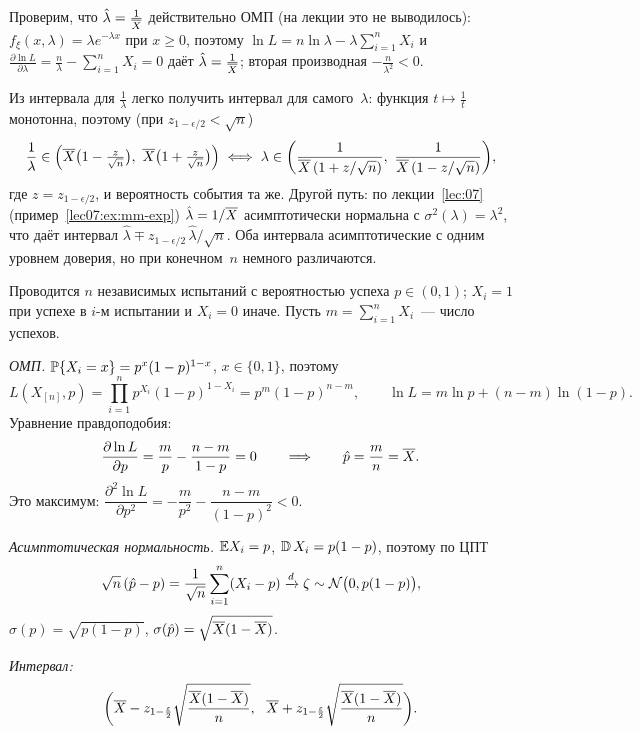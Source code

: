\begin{addendum}
  Проверим, что $\hat\lambda = \frac1\Xbar$ действительно ОМП (на лекции это не выводилось):
  $f_\xi(x, \lambda) = \lambda e^{-\lambda x}$ при $x \ge 0$, поэтому
  $\ln L = n \ln\lambda - \lambda \sum_{i=1}^n X_i$ и
  $\frac{\partial \ln L}{\partial \lambda} = \frac{n}{\lambda} - \sum_{i=1}^n X_i = 0$ даёт
  $\hat\lambda = \frac{1}{\Xbar}$; вторая производная $-\frac{n}{\lambda^2} < 0$.

  \smallskip
  Из интервала для $\frac1\lambda$ легко получить интервал для самого~$\lambda$: функция
  $t \mapsto \frac1t$ монотонна, поэтому (при $z_{1-\epsilon/2} < \sqrt n$)
  \[
    \frac1\lambda \in \Bigl( \Xbar\bigl(1 - \tfrac{z}{\sqrt n}\bigr),\ \Xbar\bigl(1 + \tfrac{z}{\sqrt n}\bigr) \Bigr)
    \iff
    \lambda \in \biggl( \frac{1}{\Xbar\,(1 + z/\sqrt n)},\ \frac{1}{\Xbar\,(1 - z/\sqrt n)} \biggr),
  \]
  где $z = z_{1-\epsilon/2}$, и вероятность события та же. Другой путь: по лекции~\ref{lec:07}
  (пример~\ref{lec07:ex:mm-exp}) $\hat\lambda = 1/\Xbar$ асимптотически нормальна с
  $\sigma^2(\lambda) = \lambda^2$, что даёт интервал
  $\hat\lambda \mp z_{1-\epsilon/2}\, \hat\lambda / \sqrt n$. Оба интервала асимптотические
  с одним уровнем доверия, но при конечном~$n$ немного различаются.
\end{addendum}

\begin{example}
  \label{lec08:ex:bernoulli}
  Проводится $n$ независимых испытаний с вероятностью успеха $p \in (0, 1)$; $X_i = 1$
  при успехе в $i$-м испытании и $X_i = 0$ иначе. Пусть $m = \sum_{i=1}^n X_i$~--- число успехов.

  \emph{ОМП.} $\P\{X_i = x\} = p^x (1 - p)^{1-x}$, $x \in \{0, 1\}$, поэтому
  \[
    L(X_{[n]}, p) = \prod_{i=1}^n p^{X_i} (1 - p)^{1 - X_i} = p^m (1 - p)^{n - m},
    \qquad
    \ln L = m \ln p + (n - m) \ln(1 - p).
  \]
  Уравнение правдоподобия:
  \[
    \frac{\partial \ln L}{\partial p} = \frac{m}{p} - \frac{n - m}{1 - p} = 0
    \qquad\Longrightarrow\qquad
    \hat p = \frac{m}{n} = \Xbar.
  \]
  Это максимум: $\dfrac{\partial^2 \ln L}{\partial p^2} = -\dfrac{m}{p^2} - \dfrac{n - m}{(1 - p)^2} < 0$.

  \emph{Асимптотическая нормальность.} $\E X_i = p$, $\D X_i = p(1 - p)$, поэтому по ЦПТ
  \[
    \sqrt{n}\,(\hat p - p) = \frac{1}{\sqrt n} \sum_{i=1}^n (X_i - p) \tod \zeta \sim \Norm\bigl(0, p(1 - p)\bigr),
  \]
  $\sigma(p) = \sqrt{p(1 - p)}$, $\sigma(\hat p) = \sqrt{\Xbar(1 - \Xbar)}$.

  \emph{Интервал:}
  \[
    \biggl( \Xbar - z_{1 - \frac\epsilon2} \sqrt{\frac{\Xbar(1 - \Xbar)}{n}},\ \
            \Xbar + z_{1 - \frac\epsilon2} \sqrt{\frac{\Xbar(1 - \Xbar)}{n}} \biggr).
  \]
\end{example}

